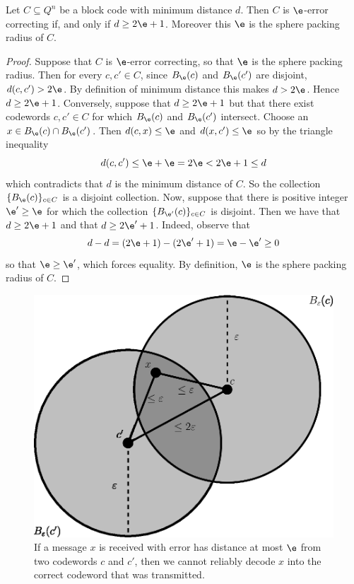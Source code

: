 \begin{lemma}\label{lemma_1.1.2}
  Let $C \subseteq Q^n$ be a block code with minimum distance $d$. Then $C$ is
  $\e$-error correcting if, and only if $d \geq 2\e+1$. Moreover this $\e$ is
  the sphere packing radius of $C$.
\end{lemma}
\begin{proof}
  Suppose that $C$ is $\e$-error correcting, so that $\e$ is the sphere packing
  radius. Then for every $c,c' \in C$, since $B_\e(c)$ and $B_\e(c')$ are
  disjoint, $d(c,c') > 2\e$. By definition of minimum distance this makes
  $d>2\e$. Hence $d \geq 2\e+1$. Conversely, suppose that $d \geq 2\e+1$ but
  that there exist codewords $c,c' \in C$ for which $B_\e(c)$ and $B_\e(c')$
  intersect. Choose an $x \in B_\e(c) \cap B_\e(c')$. Then $d(c,x) \leq \e$ and
  $d(x,c') \leq \e$ so by the triangle inequality
  \begin{equation*}
    d(c,c') \leq \e+\e=2\e<2\e+1 \leq d
  \end{equation*}
  which contradicts that $d$ is the minimum distance of $C$. So the collection
  $\{B_\e(c)\}_{c \in C}$ is a disjoint collection. Now, suppose that there is
  positive integer $\e' \geq \e$ for which the collection $\{B_{\e'}(c)\}_{c \in
  C}$ is disjoint. Then we have that $d \geq 2\e+1$ and that $d \geq 2\e'+1$.
  Indeed, observe that
  \begin{equation*}
    d-d=(2\e+1)-(2\e'+1)=\e-\e' \geq 0
  \end{equation*}
  so that $\e \geq \e'$, which forces equality. By definition, $\e$ is the
  sphere packing radius of $C$.
\end{proof}

\begin{figure}[h]
  \centering
  \includegraphics[scale = 0.5]{Figures/chapter1/sphere_packing.eps}
  \caption{If a message $x$ is received with error has distance at most $\e$
  from two codewords $c$ and $c'$, then we cannot reliably decode $x$ into the
  correct codeword that was transmitted.}
  \label{figure_1.1}
\end{figure}

